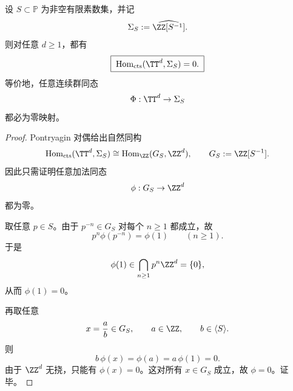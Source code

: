 \begin{theorem}\label{thm:xi-cdim-localization-solenoid-no-nontrivial-torus-input}
设 \(S\subset\mathbb P\) 为非空有限素数集，并记
\[
\Sigma_S:=\widehat{\ZZ[S^{-1}]}.
\]
则对任意 \(d\ge 1\)，都有
\[
\boxed{\;
\operatorname{Hom}_{\mathrm{cts}}(\TT^d,\Sigma_S)=0.\;}
\]
等价地，任意连续群同态
\[
\Phi:\TT^d\to \Sigma_S
\]
都必为零映射。
\end{theorem}
\begin{proof}
Pontryagin 对偶给出自然同构
\[
\operatorname{Hom}_{\mathrm{cts}}(\TT^d,\Sigma_S)
\cong
\operatorname{Hom}_{\ZZ}(G_S,\ZZ^d),
\qquad
G_S:=\ZZ[S^{-1}].
\]
因此只需证明任意加法同态
\[
\phi:G_S\to \ZZ^d
\]
都为零。

取任意 \(p\in S\)。由于 \(p^{-n}\in G_S\) 对每个 \(n\ge 1\) 都成立，故
\[
p^n\phi(p^{-n})=\phi(1)
\qquad(n\ge 1).
\]
于是
\[
\phi(1)\in \bigcap_{n\ge 1}p^n\ZZ^d=\{0\},
\]
从而 \(\phi(1)=0\)。

再取任意
\[
x=\frac{a}{b}\in G_S,
\qquad
a\in \ZZ,
\qquad
b\in \langle S\rangle.
\]
则
\[
b\,\phi(x)=\phi(a)=a\,\phi(1)=0.
\]
由于 \(\ZZ^d\) 无挠，只能有 \(\phi(x)=0\)。这对所有 \(x\in G_S\) 成立，故 \(\phi=0\)。证毕。
\end{proof}

